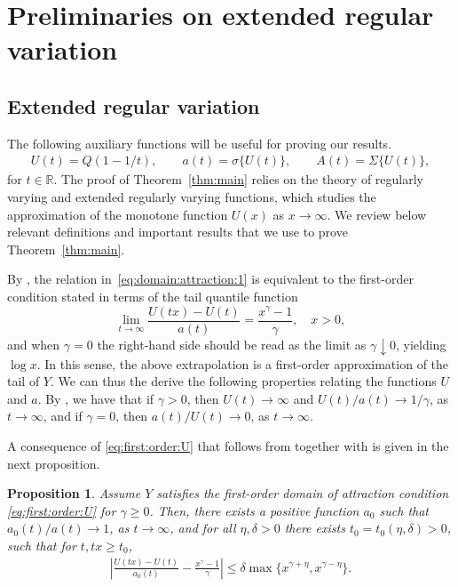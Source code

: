 \documentclass{statsoc}
\newtheorem{proposition}{Proposition}
\theoremstyle{break}
\newcommand{\beam}{\begin{eqnarray}}
\newcommand{\eeam}{\end{eqnarray}\noindent}
\begin{document}






\appendix 


\section{Preliminaries on extended regular variation}\label{sec:appendix}

\subsection{Extended regular variation}\label{sec:app:1}

The following auxiliary functions will be useful for proving our results.  
\beam\label{eq:notation}
U(t) = Q(1 - 1/t), \qquad a(t) = \sigma\{U(t)\}, \qquad  A(t)  = \Sigma\{U(t)\},
\eeam 
for $t\in\mathbb{R}$. 
The proof of Theorem~\ref{thm:main} relies on the theory of regularly varying and extended regularly varying functions, which studies the approximation of the monotone function $U(x)$ as $x \to \infty$. We review below relevant definitions and important results that we use to prove Theorem~\ref{thm:main}.

By \cite[Theorem 1.1.6]{dehaan:ferreira:2006}, the relation in~\eqref{eq:domain:attraction:1}
is equivalent to the first-order condition stated in terms of the tail quantile function 
\begin{equation}\label{eq:first:order:U}
	\lim_{t \to \infty} \frac{U(tx) - U(t)}{a(t)} = \frac{x^\gamma - 1}{\gamma}, \quad x >0,
\end{equation}
and when $\gamma = 0$ the right-hand side should be read as the limit as $ \gamma \downarrow 0$, 
yielding $\log x$. 
In this sense, the above extrapolation is a first-order approximation of the tail of $Y$. 
We can thus the derive the following properties relating the functions $U$ and $a$. 
By \citet[][Lemma 1.2.9]{dehaan:ferreira:2006}, we have that if $\gamma > 0$,
then $U(t) \to \infty$ and $U(t)/a(t) \to 1/\gamma$, as $t \to \infty$, and if $\gamma = 0$, then $a(t)/U(t) \to 0$, as $t \to \infty$.

A consequence of \eqref{eq:first:order:U} that follows from \cite[Proposition B.2.17]{dehaan:ferreira:2006} together with \cite[Theorem B.2.18]{dehaan:ferreira:2006} is given in the next proposition.
\begin{proposition}\label{lema:potters:bounds}
	Assume $Y$ satisfies the first-order domain of attraction condition \eqref{eq:first:order:U} for $\gamma \geq 0$.   Then, there exists a positive function $a_0$ such that $a_0(t)/a(t) \to 1$, as $t \to \infty$, and for all $ \eta, \delta > 0$ there exists $t_0 = t_0(\eta,\delta) > 0$, such that for $t , tx \geq  t_0 $,
	\beam\label{eq:potter}
	\left| \frac{U(tx) - U(t) }{a_0(t)} - \frac{x^\gamma - 1}{\gamma} \right| \leq \delta \max\{ x^{\gamma +\eta}, x^{\gamma - \eta}\}.   
	\eeam  
\end{proposition}
\end{document}
